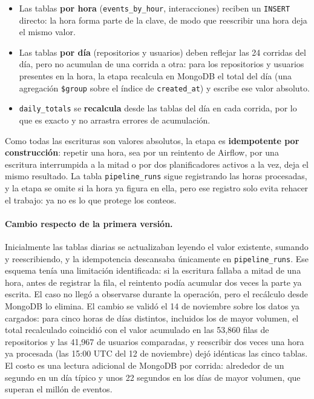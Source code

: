 \begin{itemize}[leftmargin=*]
    \item Las tablas \textbf{por hora} (\texttt{events\_by\_hour}, interacciones) reciben un \texttt{INSERT} directo: la hora forma parte de la clave, de modo que reescribir una hora deja el mismo valor.
    \item Las tablas \textbf{por día} (repositorios y usuarios) deben reflejar las 24 corridas del día, pero no acumulan de una corrida a otra: para los repositorios y usuarios presentes en la hora, la etapa recalcula en MongoDB el total del día (una agregación \texttt{\$group} sobre el índice de \texttt{created\_at}) y escribe ese valor absoluto.
    \item \texttt{daily\_totals} se \textbf{recalcula} desde las tablas del día en cada corrida, por lo que es exacto y no arrastra errores de acumulación.
\end{itemize}

Como todas las escrituras son valores absolutos, la etapa es \textbf{idempotente por construcción}: repetir una hora, sea por un reintento de Airflow, por una escritura interrumpida a la mitad o por dos planificadores activos a la vez, deja el mismo resultado. La tabla \texttt{pipeline\_runs} sigue registrando las horas procesadas, y la etapa se omite si la hora ya figura en ella, pero ese registro solo evita rehacer el trabajo: ya no es lo que protege los conteos.

\paragraph{Cambio respecto de la primera versión.} Inicialmente las tablas diarias se actualizaban leyendo el valor existente, sumando y reescribiendo, y la idempotencia descansaba únicamente en \texttt{pipeline\_runs}. Ese esquema tenía una limitación identificada: si la escritura fallaba a mitad de una hora, antes de registrar la fila, el reintento podía acumular dos veces la parte ya escrita. El caso no llegó a observarse durante la operación, pero el recálculo desde MongoDB lo elimina. El cambio se validó el 14 de noviembre sobre los datos ya cargados: para cinco horas de días distintos, incluidos los de mayor volumen, el total recalculado coincidió con el valor acumulado en las 53,860 filas de repositorios y las 41,967 de usuarios comparadas, y reescribir dos veces una hora ya procesada (las 15:00 UTC del 12 de noviembre) dejó idénticas las cinco tablas. El costo es una lectura adicional de MongoDB por corrida: alrededor de un segundo en un día típico y unos 22 segundos en los días de mayor volumen, que superan el millón de eventos.


